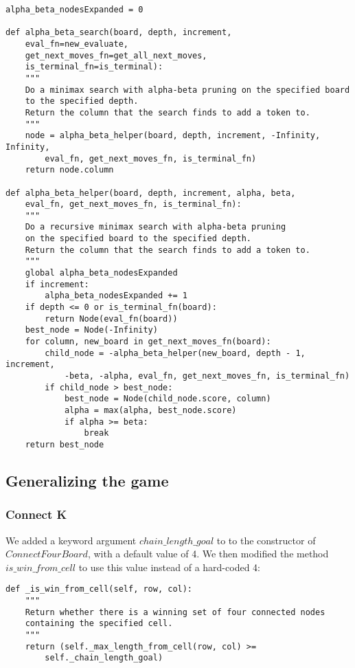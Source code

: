 \documentclass[11pt]{article}
\begin{document}
\lstset{language=Python}
\begin{lstlisting}[frame=single]
alpha_beta_nodesExpanded = 0

def alpha_beta_search(board, depth, increment,
	eval_fn=new_evaluate,
	get_next_moves_fn=get_all_next_moves,
	is_terminal_fn=is_terminal):
	"""
	Do a minimax search with alpha-beta pruning on the specified board
	to the specified depth.
	Return the column that the search finds to add a token to.
	"""
	node = alpha_beta_helper(board, depth, increment, -Infinity, Infinity,
		eval_fn, get_next_moves_fn, is_terminal_fn)
	return node.column

def alpha_beta_helper(board, depth, increment, alpha, beta,
	eval_fn, get_next_moves_fn, is_terminal_fn):
	"""
	Do a recursive minimax search with alpha-beta pruning
	on the specified board to the specified depth.
	Return the column that the search finds to add a token to.
	"""
	global alpha_beta_nodesExpanded
	if increment:
		alpha_beta_nodesExpanded += 1
	if depth <= 0 or is_terminal_fn(board):
		return Node(eval_fn(board))
	best_node = Node(-Infinity)
	for column, new_board in get_next_moves_fn(board):
		child_node = -alpha_beta_helper(new_board, depth - 1, increment,
			-beta, -alpha, eval_fn, get_next_moves_fn, is_terminal_fn)
		if child_node > best_node:
			best_node = Node(child_node.score, column)
			alpha = max(alpha, best_node.score)
			if alpha >= beta:
				break
	return best_node
\end{lstlisting}

\subsection{Generalizing the game}

\subsubsection{Connect K}

We added a keyword argument \(chain\_length\_goal\) to to the constructor of
\(ConnectFourBoard\), with a default value of 4. We then modified the method
\(is\_win\_from\_cell\) to use this value instead of a hard-coded 4:

\lstset{language=Python}
\begin{lstlisting}[frame=single]
def _is_win_from_cell(self, row, col):
	"""
	Return whether there is a winning set of four connected nodes
	containing the specified cell.
	"""
	return (self._max_length_from_cell(row, col) >=
		self._chain_length_goal)
\end{lstlisting}
\end{document}
